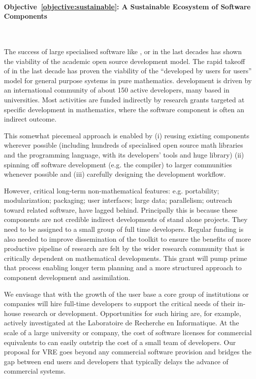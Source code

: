 \documentclass[noworkareas,deliverables,\classoptions]{euproposal}       %
\begin{document}
\begin{proposal}
\paragraph{Objective~\ref{objective:sustainable}: A Sustainable
  Ecosystem of Software Components}\ 

The success of large specialised software like \PariGP, \Singular or
\GAP in the last decades has shown the viability of the academic open
source development model. The rapid takeoff of \Sage in the last
decade has proven the viability of the ``developed by users for
users'' model for general purpose systems in pure mathematics.  \Sage
development is driven by an international community of about 150
active developers, many based in universities.  Most activities are
funded indirectly by research grants targeted at specific development
in mathematics, where the software component is often an indirect
outcome.

This somewhat piecemeal approach is enabled by (i) reusing existing
components wherever possible (including hundreds of specialised open
source math libraries and the \Python programming language, with its
developers' tools and huge library) (ii) spinning off software
development (e.g. the \Cython compiler) to larger communities whenever
possible and (iii) carefully designing the development workflow.

However, critical long-term non-mathematical features:
e.g. portability; modularization; packaging; user interfaces; large
data; parallelism; outreach toward related software, have lagged
behind. Principally this is because these components are not credible
indirect developments of stand alone projects. They need to be
assigned to a small group of full time developers. Regular funding is
also needed to improve dissemination of the toolkit to ensure the
benefits of more productive pipeline of research are felt by the wider
research community that is critically dependent on mathematical
developments. This grant will pump prime that process enabling longer
term planning and a more structured approach to component development
and assimilation.

We envisage that with the growth of the user base a core group of
institutions or companies will hire full-time developers to support
the critical needs of their in-house research or development.
Opportunities for such hiring are, for example, actively investigated
at the Laboratoire de Recherche en Informatique. At the scale of a
large university or company, the cost of software licenses for
commercial equivalents to \Sage can easily outstrip the cost of a
small team of developers. Our proposal for VRE goes beyond any
commercial software provision and bridges the gap between end users
and developers that typically delays the advance of commercial
systems.


\end{proposal}
\end{document}
